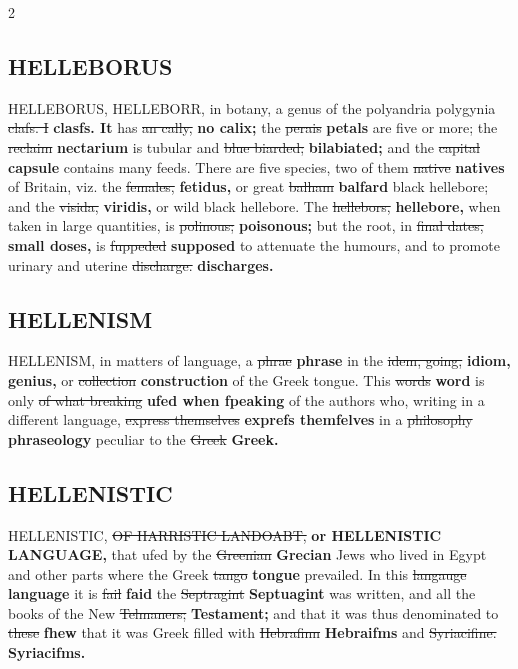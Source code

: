 \documentclass[10pt]{article}
\begin{document}
\begin{multicols}{2}
\subsection*{HELLEBORUS}
HELLEBORUS, HELLEBORR, in botany, a genus of the polyandria polygynia \sout{clafs. I} \textbf{clasfs. It} has \sout{an cally,} \textbf{no calix;} the \sout{perais} \textbf{petals} are five or more; the \sout{reclaim} \textbf{nectarium} is tubular and \sout{blue biarded;} \textbf{bilabiated;} and the \sout{capital} \textbf{capsule} contains many feeds. There are five species, two of them \sout{native} \textbf{natives} of Britain, viz. the \sout{females,} \textbf{fetidus,} or great \sout{balham} \textbf{balfard} black hellebore; and the \sout{visida,} \textbf{viridis,} or wild black hellebore. The \sout{hellebors,} \textbf{hellebore,} when taken in large quantities, is \sout{polinous;} \textbf{poisonous;} but the root, in \sout{final dates,} \textbf{small doses,} is \sout{fuppeded} \textbf{supposed} to attenuate the humours, and to promote urinary and uterine \sout{discharge.} \textbf{discharges.}

\subsection*{HELLENISM}
HELLENISM, in matters of language, a \sout{phrae} \textbf{phrase} in the \sout{idem, going,} \textbf{idiom, genius,} or \sout{collection} \textbf{construction} of the Greek tongue. This \sout{words} \textbf{word} is only \sout{of what breaking} \textbf{ufed when fpeaking} of the authors who, writing in a different language, \sout{express themselves} \textbf{exprefs themfelves} in a \sout{philosophy} \textbf{phraseology} peculiar to the \sout{Greek} \textbf{Greek.}

\subsection*{HELLENISTIC}
HELLENISTIC, \sout{OF HARRISTIC LANDOABT,} \textbf{or HELLENISTIC LANGUAGE,} that ufed by the \sout{Greenian} \textbf{Grecian} Jews who lived in Egypt and other parts where the Greek \sout{tango} \textbf{tongue} prevailed. In this \sout{langauge} \textbf{language} it is \sout{fail} \textbf{faid} the \sout{Septragint} \textbf{Septuagint} was written, and all the books of the New \sout{Telmaners;} \textbf{Testament;} and that it was thus denominated to \sout{these} \textbf{fhew} that it was Greek filled with \sout{Hebrafinn} \textbf{Hebraifms} and \sout{Syriacifine.} \textbf{Syriacifms.}


\end{multicols}
\end{document}
